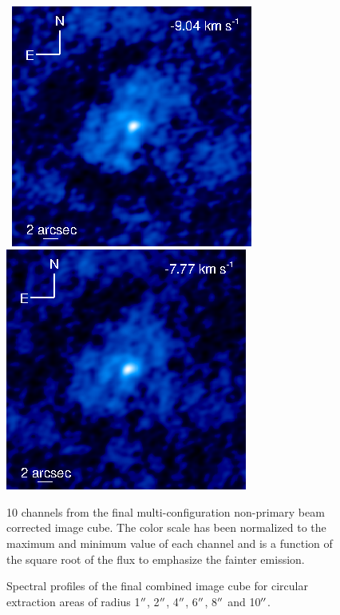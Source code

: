 \documentclass[manuscript]{aastex}
\begin{document}
\begin{figure}[hbt!]
{         }
\\
\mbox{
          \includegraphics[]{f10.eps}
          \includegraphics[]{f11.eps}
         }
\caption[]{10 channels from the final multi-configuration non-primary beam corrected image cube. The color scale has been normalized to the maximum and minimum value of each channel and is a function of the square root of the flux to emphasize the fainter emission.}
\label{fig:fig2}
\end{figure}


\clearpage

\begin{figure}
\caption{Spectral profiles of the final combined image cube for circular extraction areas of radius 1$\mbox{$^{\prime\prime}$}$, 2$\mbox{$^{\prime\prime}$}$, 4$\mbox{$^{\prime\prime}$}$, 6$\mbox{$^{\prime\prime}$}$, 8$\mbox{$^{\prime\prime}$}$ and 10$\mbox{$^{\prime\prime}$}$.}
\label{fig:fig4}
\end{figure}

\clearpage
\end{document}

